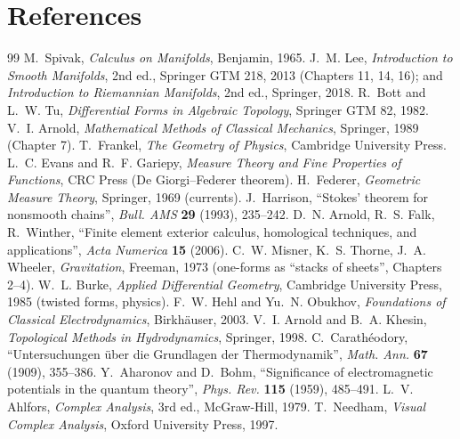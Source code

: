 \documentclass[11pt,a4paper]{article}
\numberwithin{equation}{section}
\theoremstyle{definition}
\theoremstyle{plain}
\begin{document}
\section*{References}\label{sec:refs}

\begin{thebibliography}{99}\small
{} M.~Spivak, \emph{Calculus on Manifolds}, Benjamin, 1965.
 J.~M. Lee, \emph{Introduction to Smooth Manifolds}, 2nd ed., Springer GTM 218, 2013 (Chapters 11, 14, 16); and \emph{Introduction to Riemannian Manifolds}, 2nd ed., Springer, 2018.
 R.~Bott and L.~W. Tu, \emph{Differential Forms in Algebraic Topology}, Springer GTM 82, 1982.
 V.~I. Arnold, \emph{Mathematical Methods of Classical Mechanics}, Springer, 1989 (Chapter 7).
 T.~Frankel, \emph{The Geometry of Physics}, Cambridge University Press.
 L.~C. Evans and R.~F. Gariepy, \emph{Measure Theory and Fine Properties of Functions}, CRC Press (De Giorgi--Federer theorem).
 H.~Federer, \emph{Geometric Measure Theory}, Springer, 1969 (currents).
 J.~Harrison, ``Stokes' theorem for nonsmooth chains'', \emph{Bull. AMS} \textbf{29} (1993), 235--242.
 D.~N. Arnold, R.~S. Falk, R.~Winther, ``Finite element exterior calculus, homological techniques, and applications'', \emph{Acta Numerica} \textbf{15} (2006).
 C.~W. Misner, K.~S. Thorne, J.~A. Wheeler, \emph{Gravitation}, Freeman, 1973 (one-forms as ``stacks of sheets'', Chapters 2--4).
 W.~L. Burke, \emph{Applied Differential Geometry}, Cambridge University Press, 1985 (twisted forms, physics).
 F.~W. Hehl and Yu.~N. Obukhov, \emph{Foundations of Classical Electrodynamics}, Birkh\"auser, 2003.
 V.~I. Arnold and B.~A. Khesin, \emph{Topological Methods in Hydrodynamics}, Springer, 1998.
 C.~Carath\'eodory, ``Untersuchungen \"uber die Grundlagen der Thermodynamik'', \emph{Math. Ann.} \textbf{67} (1909), 355--386.
 Y.~Aharonov and D.~Bohm, ``Significance of electromagnetic potentials in the quantum theory'', \emph{Phys. Rev.} \textbf{115} (1959), 485--491.
 L.~V. Ahlfors, \emph{Complex Analysis}, 3rd ed., McGraw-Hill, 1979.
 T.~Needham, \emph{Visual Complex Analysis}, Oxford University Press, 1997.

\end{thebibliography}
\end{document}
